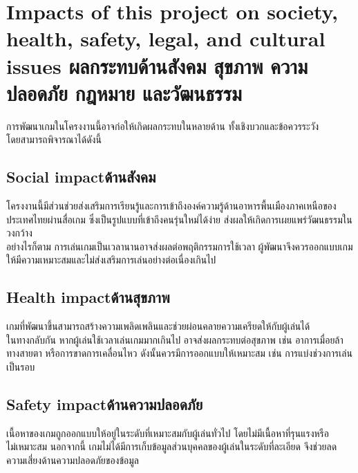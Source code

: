 \section{\ifenglish%
Impacts of this project on society, health, safety, legal, and cultural issues
\else%
ผลกระทบด้านสังคม สุขภาพ ความปลอดภัย กฎหมาย และวัฒนธรรม
\fi}

    \hspace{1.5em}การพัฒนาเกมในโครงงานนี้อาจก่อให้เกิดผลกระทบในหลายด้าน ทั้งเชิงบวกและข้อควรระวัง \\โดยสามารถพิจารณาได้ดังนี้

\subsection{\ifenglish Social impact\else ด้านสังคม\fi}
    \hspace{1.5em}โครงงานนี้มีส่วนช่วยส่งเสริมการเรียนรู้และการเข้าถึงองค์ความรู้ด้านอาหารพื้นเมืองภาคเหนือของ\\ประเทศไทยผ่านสื่อเกม ซึ่งเป็นรูปแบบที่เข้าถึงคนรุ่นใหม่ได้ง่าย ส่งผลให้เกิดการเผยแพร่วัฒนธรรมในวงกว้าง 
    \\อย่างไรก็ตาม การเล่นเกมเป็นเวลานานอาจส่งผลต่อพฤติกรรมการใช้เวลา ผู้พัฒนาจึงควรออกแบบเกมให้มีความเหมาะสมและไม่ส่งเสริมการเล่นอย่างต่อเนื่องเกินไป

\subsection{\ifenglish Health impact\else ด้านสุขภาพ\fi}
    \hspace{1.5em}เกมที่พัฒนาขึ้นสามารถสร้างความเพลิดเพลินและช่วยผ่อนคลายความเครียดให้กับผู้เล่นได้
    \\ในทางกลับกัน หากผู้เล่นใช้เวลาเล่นเกมมากเกินไป อาจส่งผลกระทบต่อสุขภาพ เช่น อาการเมื่อยล้าทางสายตา หรือการขาดการเคลื่อนไหว ดังนั้นควรมีการออกแบบให้เหมาะสม เช่น การแบ่งช่วงการเล่นเป็นรอบ

\subsection{\ifenglish Safety impact\else ด้านความปลอดภัย\fi}
    \hspace{1.5em}เนื้อหาของเกมถูกออกแบบให้อยู่ในระดับที่เหมาะสมกับผู้เล่นทั่วไป โดยไม่มีเนื้อหาที่รุนแรงหรือ\\ไม่เหมาะสม นอกจากนี้ เกมไม่ได้มีการเก็บข้อมูลส่วนบุคคลของผู้เล่นในระดับที่ละเอียด จึงช่วยลดความเสี่ยงด้านความปลอดภัยของข้อมูล

